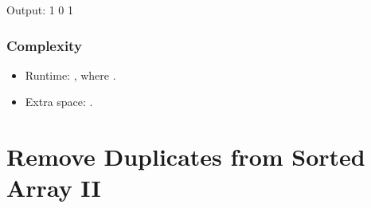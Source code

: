 \documentclass[letterpaper,12pt,english]{book}
\begin{document}
\begin{sphinxVerbatim}[commandchars=\\\{\}]
\end{sphinxVerbatim}

\begin{sphinxVerbatim}[commandchars=\\\{\}]
Output:
1
0
1
\end{sphinxVerbatim}


\subsubsection{Complexity}
\label{\detokenize{Sorting/04_SORT_729_My_Calendar_I:id2}}\begin{itemize}
\item {} 
\sphinxAtStartPar
Runtime: , where .

\item {} 
\sphinxAtStartPar
Extra space: .

\end{itemize}

\sphinxstepscope


\section{Remove Duplicates from Sorted Array II}
\label{\detokenize{Sorting/04_SORT_80_Remove_Duplicates_from_Sorted_Array:remove-duplicates-from-sorted-array-ii}}\label{\detokenize{Sorting/04_SORT_80_Remove_Duplicates_from_Sorted_Array::doc}}
\end{document}
